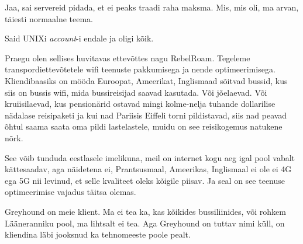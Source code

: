 
Jaa, sai servereid pidada, et ei peaks traadi raha maksma. Mis, mis oli, ma 
arvan, täiesti normaalne teema.


Said UNIXi \emph{account}-i endale ja oligi kõik.


Praegu olen sellises huvitavas ettevõttes nagu RebelRoam. 
Tegeleme transpordiettevõtetele wifi teenuste pakkumisega ja nende 
optimeerimisega. Kliendibaasiks on mööda Euroopat, Ameerikat, Inglismaad 
sõitvad bussid, kus siis on bussis wifi, mida  bussireisijad saavad kasutada. 
Või jõelaevad. Või kruiisilaevad, kus pensionärid ostavad mingi kolme-nelja 
tuhande dollarilise nädalase reisipaketi ja kui nad Pariisis Eiffeli torni 
pildistavad, siis nad peavad õhtul saama saata oma pildi lastelastele, muidu on 
see reisikogemus natukene nõrk. 

See võib tunduda  eestlasele imelikuna, meil on internet kogu aeg igal pool 
vabalt kättesaadav, aga näidetena ei, Prantsusmaal, Ameerikas, Inglismaal ei 
ole ei 4G ega 5G nii levinud, et selle kvaliteet oleks kõigile piisav. Ja seal 
on see teenuse optimeerimise vajadus täitsa olemas.


Greyhound on meie klient. Ma ei tea ka, kas kõikides bussiliinides, või rohkem 
Lääneranniku pool, ma lihtsalt ei tea. Aga Greyhound on tuttav nimi küll,  on 
kliendina läbi jooksnud ka tehnomeeste poole pealt.


